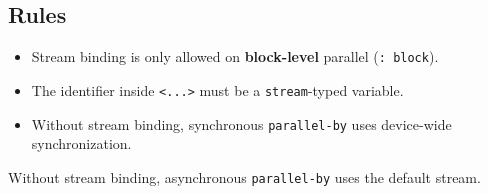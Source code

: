 \subsection*{Rules}

\begin{itemize}[leftmargin=1.6em]
\item Stream binding is only allowed on \textbf{block-level} parallel (\texttt{: block}).
\item The identifier inside \texttt{\textless{}.\allowbreak{}.\allowbreak{}.\allowbreak{}\textgreater{}} must be a \texttt{stream}-typed variable.
\item Without stream binding, synchronous \texttt{parallel-by} uses device-wide synchronization.
\end{itemize}

Without stream binding, asynchronous \texttt{parallel-by} uses the default stream.
